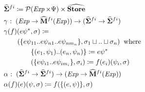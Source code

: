 \small\begin{align*}
&\hspace{0em}  \widehat{\mathtt{\mathbf{\Sigma}}}  ^{ fi }   \coloneqq   \mathcal{P}  (\operatorname{\mathit{Exp}}   \times   \Psi )  \times   \widehat{\mathtt{\mathbf{Store}}}  \\
&\hspace{0em}  \gamma   \mathbin{\colon}   (\operatorname{\mathit{Exp}}   \rightarrow   \widehat{\mathtt{\mathbf{M}}} ^{  fi }  (\operatorname{\mathit{Exp}}) )  \rightarrow  ( \widehat{\mathtt{\mathbf{\Sigma}}}  ^{ fi }   \rightarrow   \widehat{\mathtt{\mathbf{\Sigma}}}  ^{ fi } ) \\
&\hspace{0em}  \gamma (f)(e \psi  ^{ * } , \sigma )  \coloneqq   \\
&\hspace{2em} ( \{ e \psi  _{ 11 }  .. e \psi  _{ n1 }  .. e \psi  _{ nm _n  }  \} ,  \sigma  _1   \sqcup  ..  \sqcup   \sigma  _n )  \;\;\text{where}\;\;   \\
&\hspace{4em}  \{ (e _1 , \psi  _1 ) .. (e _n , \psi  _n ) \}   \coloneqq  e \psi  ^{ * }  \\
&\hspace{4em} ( \{ e \psi  _{ i1 }  .. e \psi  _{ im _i  }  \} , \sigma  _i )  \coloneqq  f(e _i )( \psi  _i , \sigma ) \\
&\hspace{0em}  \alpha    \mathbin{\colon}  ( \widehat{\mathtt{\mathbf{\Sigma}}}  ^{ fi }   \rightarrow   \widehat{\mathtt{\mathbf{\Sigma}}}  ^{ fi } )  \rightarrow   (\operatorname{\mathit{Exp}}   \rightarrow   \widehat{\mathtt{\mathbf{M}}} ^{  fi }  (\operatorname{\mathit{Exp}}) ) \\
&\hspace{0em}  \alpha (f)(e)( \psi , \sigma )  \coloneqq  f( \{ (e, \psi ) \} , \sigma )
\end{align*}\normalsize

